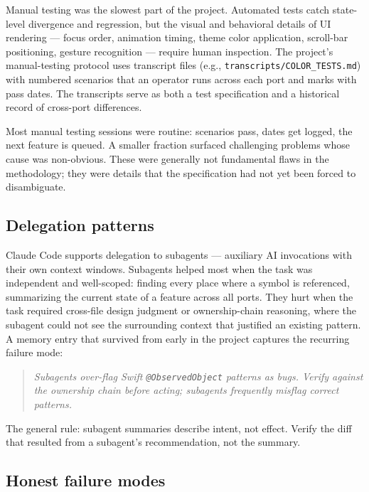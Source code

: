 \documentclass[10pt]{article}
\begin{document}
Manual testing was the slowest part of the project. Automated tests catch
state-level divergence and regression, but the visual and behavioral
details of UI rendering --- focus order, animation timing, theme color
application, scroll-bar positioning, gesture recognition --- require
human inspection. The project's manual-testing protocol uses transcript
files (e.g., \texttt{transcripts/COLOR\_TESTS.md}) with numbered
scenarios that an operator runs across each port and marks with pass
dates. The transcripts serve as both a test specification and a
historical record of cross-port differences.

Most manual testing sessions were routine: scenarios pass, dates get
logged, the next feature is queued. A smaller fraction surfaced
challenging problems whose cause was non-obvious. These were generally
not fundamental flaws in the methodology; they were details that the
specification had not yet been forced to disambiguate.

\subsection{Delegation patterns}
\label{sec:delegation}

Claude Code supports delegation to subagents --- auxiliary AI invocations
with their own context windows. Subagents helped most when the task was
independent and well-scoped: finding every place where a symbol is
referenced, summarizing the current state of a feature across all ports.
They hurt when the task required cross-file design judgment or
ownership-chain reasoning, where the subagent could not see the
surrounding context that justified an existing pattern. A memory entry
that survived from early in the project captures the recurring failure
mode:

\begin{quote}
\emph{Subagents over-flag Swift \texttt{@ObservedObject} patterns as bugs.
Verify against the ownership chain before acting; subagents frequently
misflag correct patterns.}
\end{quote}

The general rule: subagent summaries describe intent, not effect. Verify
the diff that resulted from a subagent's recommendation, not the
summary.

\subsection{Honest failure modes}
\end{document}
